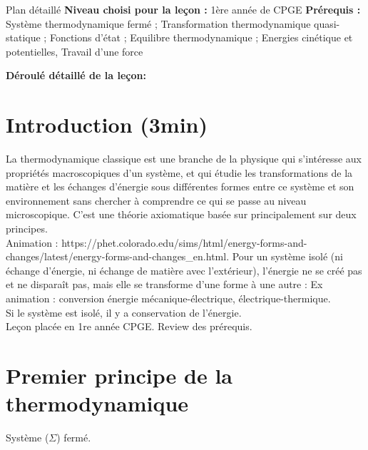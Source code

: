 \begin{reportBlock}{Plan détaillé}
  \textbf{Niveau choisi pour la leçon :} 1ère année de CPGE
  \newline
  \textbf{Prérequis :} Système thermodynamique fermé ; Transformation thermodynamique quasi-statique ; Fonctions d'état ; Equilibre thermodynamique ; Energies cinétique et potentielles, Travail d'une force 
  \newline
  
  \textbf{Déroulé détaillé de la leçon: }   \newline
  
  \section*{Introduction (3min)}
 La thermodynamique classique est une branche de la physique qui s'intéresse aux propriétés macroscopiques d'un système, et qui étudie les transformations de la matière et les échanges d'énergie sous différentes formes entre ce système et son environnement sans chercher à comprendre ce qui se passe au niveau microscopique. C'est une théorie axiomatique basée sur principalement sur deux principes.\\
  Animation : https://phet.colorado.edu/sims/html/energy-forms-and-changes/latest/energy-forms-and-changes\_en.html. Pour un système isolé (ni échange d'énergie, ni échange de matière avec l'extérieur), l'énergie ne se créé pas et ne disparaît pas, mais elle se transforme d'une forme à une autre : Ex animation : conversion énergie mécanique-électrique, électrique-thermique. \\
  Si le système est isolé, il y a conservation de l'énergie.  \\
  Leçon placée en 1re année CPGE. Review des prérequis.
  
  \section{Premier principe de la thermodynamique}
  Système ($\Sigma$) fermé.
  

\end{reportBlock}
